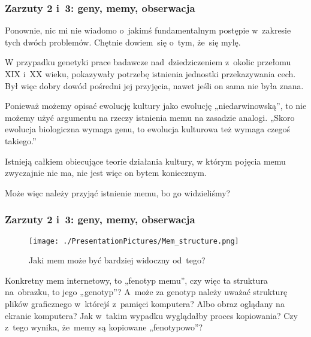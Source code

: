 \documentclass[10pt,t]{beamer}
\begin{document}
\begin{frame}
  \frametitle{Zarzuty 2 i~3: geny, memy, obserwacja}


  Ponownie, nic mi nie wiadomo o~jakimś fundamentalnym postępie
  w~zakresie tych dwóch problemów. Chętnie dowiem~się o~tym, że~się mylę.

  W przypadku genetyki prace badawcze nad~dziedziczeniem z~okolic przełomu
  XIX i~XX wieku, pokazywały potrzebę istnienia jednostki przekazywania
  cech. Był więc dobry dowód pośredni jej przyjęcia, nawet jeśli on sama
  nie była znana.

  Ponieważ możemy opisać ewolucję kultury jako ewolucję „niedarwinowską”,
  to nie możemy użyć argumentu na rzeczy istnienia memu na zasadzie
  analogi. „Skoro ewolucja biologiczna wymaga genu, to ewolucja kulturowa
  też wymaga czegoś takiego.”

  Istnieją całkiem obiecujące teorie działania kultury, w którym pojęcia
  memu zwyczajnie nie ma, nie jest więc on bytem koniecznym.

  Może więc należy przyjąć istnienie memu, bo go widzieliśmy?

\end{frame}





\begin{frame}
  \frametitle{Zarzuty 2 i~3: geny, memy, obserwacja}


  \begin{figure}

    \centering
    \texttt{[image: ./PresentationPictures/Mem\_structure.png]}

    \caption{Jaki mem może być bardziej widoczny od~tego?}

  \end{figure}


  Konkretny mem internetowy, to „fenotyp memu”, czy więc ta
  struktura na~obrazku, to jego „genotyp”? A~może za genotyp
  należy uważać strukturę plików graficznego w~którejś z~pamięci
  komputera? Albo obraz oglądany na ekranie komputera? Jak w~takim wypadku
  wyglądałby proces kopiowania? Czy z~tego wynika, że~memy są kopiowane
  „fenotypowo”?

\end{frame}
\end{document}

